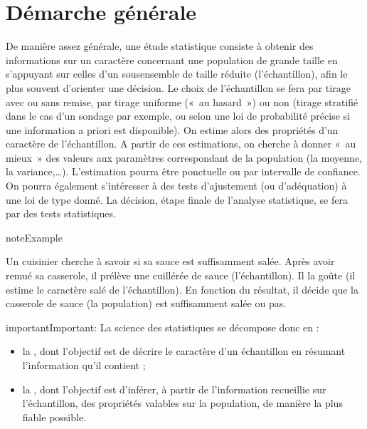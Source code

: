 \documentclass[letterpaper,10pt,french]{sphinxmanual}
\begin{document}
\chapter{Démarche générale}
\label{\detokenize{intro:demarche-generale}}
\sphinxAtStartPar
De manière assez générale, une étude statistique consiste à obtenir des informations sur un caractère concernant une population de grande taille en s’appuyant sur celles d’un sous\sphinxhyphen{}ensemble de taille réduite (l’échantillon), afin le plus souvent d’orienter une décision. Le choix de l’échantillon se fera par tirage avec ou sans remise, par tirage uniforme (« au hasard ») ou non (tirage stratifié dans le cas d’un sondage par exemple, ou selon une loi de probabilité précise si une information a priori est disponible).
On estime alors des propriétés d’un caractère de l’échantillon. A partir de ces estimations, on cherche à donner « au mieux » des valeurs aux paramètres correspondant de la population (la moyenne, la variance,…). L’estimation pourra être ponctuelle ou par intervalle de confiance. On pourra également s’intéresser à des tests d’ajustement (ou d’adéquation) à une loi de type donné. La décision, étape finale de l’analyse statistique, se fera par des tests statistiques.
\label{None:example-0}
\begin{sphinxadmonition}{note}{Example }



\sphinxAtStartPar
Un cuisinier cherche à savoir si sa sauce est suffisamment salée. Après avoir remué sa casserole, il prélève une cuillérée de sauce (l’échantillon). Il la goûte (il estime le caractère salé de l’échantillon). En fonction du résultat, il décide que la casserole de sauce (la population) est suffisamment salée ou pas.
\end{sphinxadmonition}

\begin{sphinxadmonition}{important}{Important:}
\ignorespaces 
{}\ignorespaces 
\sphinxAtStartPar
La science des statistiques se décompose donc en :
\begin{itemize}
\item {} 
\sphinxAtStartPar
la , dont l’objectif est de décrire le caractère d’un échantillon en résumant l’information qu’il contient ;

\item {} 
\sphinxAtStartPar
la , dont l’objectif est d’inférer, à partir de l’information recueillie sur l’échantillon, des propriétés valables sur la population, de manière la plus fiable possible.

\end{itemize}
\end{sphinxadmonition}
\end{document}
